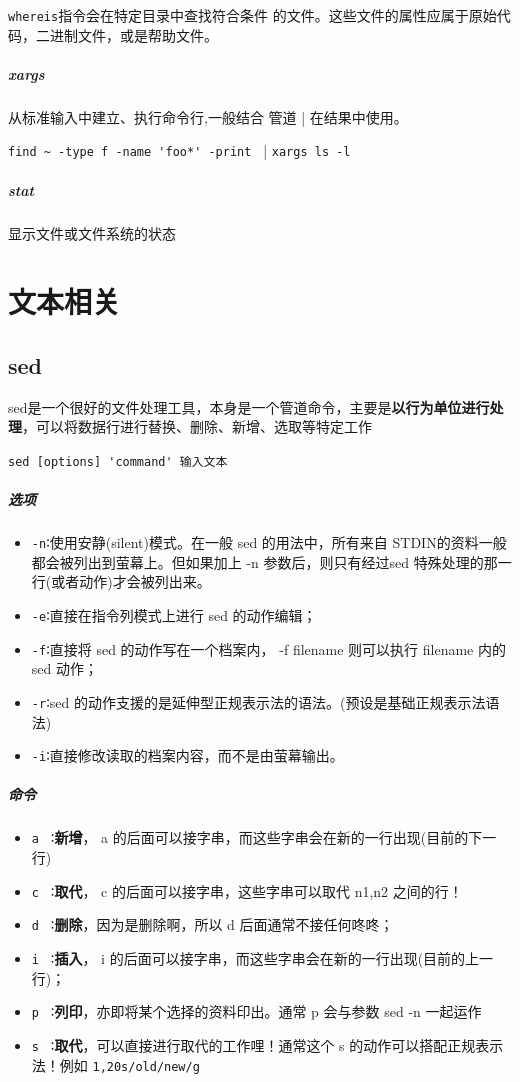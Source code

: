 \documentclass[UTF8,a4paper,12pt]{ctexbook}
\begin{document}
			\verb|whereis|指令会在特定目录中查找符合条件 的文件。这些文件的属性应属于原始代码，二进制文件，或是帮助文件。
			
		\subparagraph{xargs} 从标准输入中建立、执行命令行,一般结合 管道 | 在结果中使用。
		
			\hspace{1cm} \verb|find ~ -type f -name 'foo*' -print | | \verb|xargs ls -l|

		\subparagraph{stat} 显示文件或文件系统的状态
	
	\section{文本相关}
		\subsection{sed}sed是一个很好的文件处理工具，本身是一个管道命令，主要是\textbf{以行为单位进行处理}，可以将数据行进行替换、删除、新增、选取等特定工作
			
			\verb|sed [options] 'command' 输入文本|
			
			\subparagraph{选项}
				\begin{itemize}[itemindent = 1em]
					\item \verb|-n|∶使用安静(silent)模式。在一般 sed 的用法中，所有来自 STDIN的资料一般都会被列出到萤幕上。但如果加上 -n 参数后，则只有经过sed 特殊处理的那一行(或者动作)才会被列出来。
					
					\item \verb|-e|∶直接在指令列模式上进行 sed 的动作编辑；
					    
					\item \verb|-f|∶直接将 sed 的动作写在一个档案内， -f filename 则可以执行 filename 内的sed 动作；
					
					\item \verb|-r|∶sed 的动作支援的是延伸型正规表示法的语法。(预设是基础正规表示法语法)
					   
					\item \verb|-i|∶直接修改读取的档案内容，而不是由萤幕输出。
				\end{itemize}
			\subparagraph{命令}
				\begin{itemize}[itemindent = 1em]
					 \item \verb|a |  ∶\textbf{新增}， a 的后面可以接字串，而这些字串会在新的一行出现(目前的下一行)
					 \item \verb|c |  ∶\textbf{取代}， c 的后面可以接字串，这些字串可以取代 n1,n2 之间的行！
					 \item \verb|d |  ∶\textbf{删除}，因为是删除啊，所以 d 后面通常不接任何咚咚；
					 \item \verb|i |  ∶\textbf{插入}， i 的后面可以接字串，而这些字串会在新的一行出现(目前的上一行)；
					 \item \verb|p |  ∶\textbf{列印}，亦即将某个选择的资料印出。通常 p 会与参数 sed -n 一起运作
					 \item \verb|s |  ∶\textbf{取代}，可以直接进行取代的工作哩！通常这个 s 的动作可以搭配正规表示法！例如 \verb|1,20s/old/new/g|
				\end{itemize}
		
\end{document}
